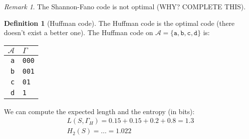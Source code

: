 \documentclass{article}
\theoremstyle{plain}
\theoremstyle{definition}
\newtheorem{defn}{Definition}
\theoremstyle{remark}
\newtheorem*{remark}{Remark}
\begin{document}
\begin{remark}
	The Shannon-Fano code is not optimal (WHY? COMPLETE THIS).
\end{remark}

\begin{defn}[Huffman code]
The Huffman code is the optimal code (there doesn't exist a better one). The Huffman code on $\mathcal A = \{\texttt a, \texttt b, \texttt c, \texttt d\}$ is:
	\begin{center}
	\begin{tabular}{r | l}
		$\mathcal A$ & $\Gamma$ \\ \hline
		\texttt a & \texttt{000} \\
		\texttt b & \texttt{001} \\
		\texttt c & \texttt{01} \\
		\texttt d & \texttt{1}	
	\end{tabular}
	\end{center}
 We can compute the expected length and the entropy (in bits):
\begin{align*}
	&L(S, \Gamma_H) = 0.15 + 0. 15 + 0.2 + 0.8 = 1.3 \\
	&H_2(S) = \ldots = 1.022
\end{align*}
\end{defn}
\end{document}
